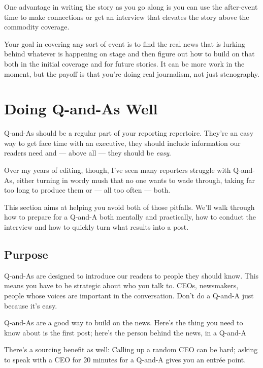 \documentclass[
  12pt,
  american,
  letterpaperpaper,
  extrafontsizes,onecolumn,openright
  ]{memoir}
\begin{document}
One advantage in writing the story as you go along is you can use the after-event time to make connections or get an interview that elevates the story above the commodity coverage.

Your goal in covering any sort of event is to find the real news that is lurking behind whatever is happening on stage and then figure out how to build on that both in the initial coverage and for future stories. It can be more work in the moment, but the payoff is that you're doing real journalism, not just stenography.

\hypertarget{doing-q-and-as-well}{%
\chapter{Doing Q-and-As Well}\label{doing-q-and-as-well}}

Q-and-As should be a regular part of your reporting repertoire. They're an easy way to get face time with an executive, they should include information our readers need and --- above all --- they should be \emph{easy}.

Over my years of editing, though, I've seen many reporters struggle with Q-and-As, either turning in wordy mush that no one wants to wade through, taking far too long to produce them or --- all too often --- both.

This section aims at helping you avoid both of those pitfalls. We'll walk through how to prepare for a Q-and-A both mentally and practically, how to conduct the interview and how to quickly turn what results into a post.

\hypertarget{purpose}{%
\section*{Purpose}\label{purpose}}

Q-and-As are designed to introduce our readers to people they should know. This means you have to be strategic about who you talk to. CEOs, newsmakers, people whose voices are important in the conversation. Don't do a Q-and-A just because it's easy.

Q-and-As are a good way to build on the news. Here's the thing you need to know about is the first post; here's the person behind the news, in a Q-and-A

There's a sourcing benefit as well: Calling up a random CEO can be hard; asking to speak with a CEO for 20 minutes for a Q-and-A gives you an entrée point.
\end{document}
